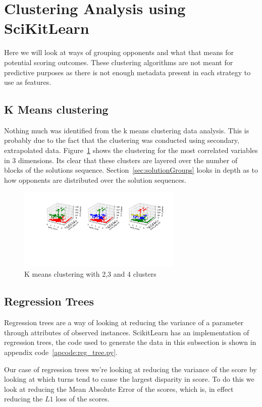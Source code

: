 \section{Clustering Analysis using SciKitLearn}
Here we will look at ways of grouping opponents and what that means for potential scoring outcomes.
These clustering algorithms are not meant for predictive purposes as there is not enough metadata present in each strategy to use as features.

\subsection{K Means clustering}\label{ssec:k_means}
Nothing much was identified from the k means clustering data analysis.
This is probably due to the fact that the clustering was conducted using secondary, extrapolated data.
Figure~\ref{fig:k_means} shows the clustering for the most correlated variables in 3 dimensions.
Its clear that these clusters are layered over the number of blocks of the solutions sequence.
Section~\ref{sec:solutionGroups} looks in depth as to how opponents are distributed over the solution sequences.  

\begin{figure}[ht]
    \includegraphics[width=0.7\textwidth, center]{./img/descriptive/k_means.pdf}
    \caption{K means clustering with 2,3 and 4 clusters}\label{fig:k_means}
\end{figure}

\subsection{Regression Trees}
Regression trees are a way of looking at reducing the variance of a parameter through attributes of observed instances. 
ScikitLearn has an implementation of regression trees, the code used to generate the data in this subsection is shown in appendix code~\ref{apcode:reg_tree.py}.

Our case of regression trees we're looking at reducing the variance of the score by looking at which turns tend to cause the largest disparity in score.
To do this we look at reducing the Mean Absolute Error of the scores, which is, in effect reducing the $L1$ loss of the scores.

